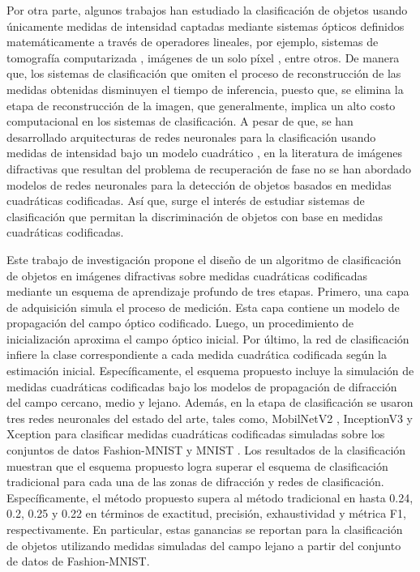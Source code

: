 Por otra parte, algunos trabajos han estudiado la clasificación de objetos usando únicamente medidas de intensidad captadas mediante sistemas ópticos definidos matemáticamente a través de operadores lineales, por ejemplo, sistemas de tomografía computarizada , imágenes de un solo píxel , entre otros. De manera que, los sistemas de clasificación que omiten el proceso de reconstrucción de las medidas obtenidas disminuyen el tiempo de inferencia, puesto que, se elimina la etapa de reconstrucción de la imagen, que generalmente, implica un alto costo computacional en los sistemas de clasificación. A pesar de que, se han desarrollado arquitecturas de redes neuronales para la clasificación usando medidas de intensidad bajo un modelo cuadrático , en la literatura de imágenes difractivas que resultan del problema de recuperación de fase no se han abordado modelos de redes neuronales para la detección de objetos basados en medidas cuadráticas codificadas. Así que, surge el interés de estudiar sistemas de clasificación que permitan la discriminación de objetos con base en medidas cuadráticas codificadas.

Este trabajo de investigación propone el diseño de un algoritmo de clasificación de objetos en imágenes difractivas sobre medidas cuadráticas codificadas mediante un esquema de aprendizaje profundo de tres etapas. Primero, una capa de adquisición simula el proceso de medición. Esta capa contiene un modelo de propagación del campo óptico codificado. Luego, un procedimiento de inicialización aproxima el campo óptico inicial. Por último, la red de clasificación infiere la clase correspondiente a cada medida cuadrática codificada según la estimación inicial. Específicamente, el esquema propuesto incluye la simulación de medidas cuadráticas codificadas bajo los modelos de propagación de difracción del campo cercano, medio y lejano. Además, en la etapa de clasificación se usaron tres redes neuronales del estado del arte, tales como, MobilNetV2 , InceptionV3  y Xception  para clasificar medidas cuadráticas codificadas simuladas sobre los conjuntos de datos Fashion-MNIST  y MNIST . Los resultados de la clasificación muestran que el esquema propuesto logra superar el esquema de clasificación tradicional para cada una de las zonas de difracción y redes de clasificación. Específicamente, el método propuesto supera al método tradicional en hasta 0.24, 0.2, 0.25 y 0.22 en términos de exactitud, precisión, exhaustividad y métrica F1, respectivamente. En particular, estas ganancias se reportan para la clasificación de objetos utilizando medidas simuladas del campo lejano a partir del conjunto de datos de Fashion-MNIST.

